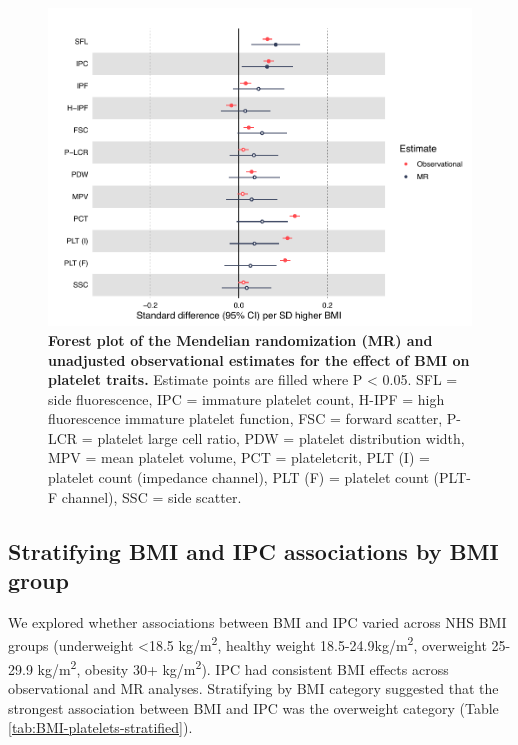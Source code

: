 \documentclass[11pt,twoside]{bristolthesis}
\begin{document}
\begin{figure}

{\centering \includegraphics[width=0.9\linewidth]{figure/BMI_platelets/BMI_platelet_forestplot} 

}

\caption[Forest plot of the Mendelian randomization and unadjusted observational estimates for the effect of BMI on platelet traits]{\textbf{Forest plot of the Mendelian randomization (MR) and unadjusted observational estimates for the effect of BMI on platelet traits.} Estimate points are filled where P \textless{} 0.05. SFL = side fluorescence, IPC = immature platelet count, H-IPF = high fluorescence immature platelet function, FSC = forward scatter, P-LCR = platelet large cell ratio, PDW = platelet distribution width, MPV = mean platelet volume, PCT = plateletcrit, PLT (I) = platelet count (impedance channel), PLT (F) = platelet count (PLT-F channel), SSC = side scatter.}\label{fig:BMI-platelet-forest}
\end{figure}
\hypertarget{stratifying-bmi-and-ipc-associations-by-bmi-group}{%
\subsection{Stratifying BMI and IPC associations by BMI group}\label{stratifying-bmi-and-ipc-associations-by-bmi-group}}

We explored whether associations between BMI and IPC varied across NHS BMI groups (underweight \textless18.5 kg/m\textsuperscript{2}, healthy weight 18.5-24.9kg/m\textsuperscript{2}, overweight 25-29.9 kg/m\textsuperscript{2}, obesity 30+ kg/m\textsuperscript{2}). IPC had consistent BMI effects across observational and MR analyses. Stratifying by BMI category suggested that the strongest association between BMI and IPC was the overweight category (Table \ref{tab:BMI-platelets-stratified}).
\end{document}
